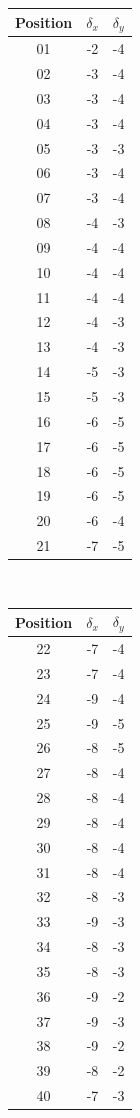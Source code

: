 \documentclass[pdftex,12pt,a4paper]{report}
\begin{document}
\begin{appendices}
\begin{table}[H]
\centering
\begin{tabular}[t]{ c | c | c }
Position & $\delta_x$ & $\delta_y$
\\
\hline
01 & -2 & -4
\\
02 & -3 & -4
\\
03 & -3 & -4
\\
04 & -3 & -4
\\
05 & -3 & -3
\\
06 & -3 & -4
\\
07 & -3 & -4
\\
08 & -4 & -3
\\
09 & -4 & -4
\\
10 & -4 & -4
\\
11 & -4 & -4
\\
12 & -4 & -3
\\
13 & -4 & -3
\\
14 & -5 & -3
\\
15 & -5 & -3
\\
16 & -6 & -5
\\
17 & -6 & -5
\\
18 & -6 & -5
\\
19 & -6 & -5
\\
20 & -6 & -4
\\
21 & -7 & -5
\end{tabular}
~
\begin{tabular}[t]{ c | c | c }
Position & $\delta_x$ & $\delta_y$
\\
\hline
22 & -7 & -4
\\
23 & -7 & -4
\\
24 & -9 & -4
\\
25 & -9 & -5
\\
26 & -8 & -5
\\
27 & -8 & -4
\\
28 & -8 & -4
\\
29 & -8 & -4
\\
30 & -8 & -4
\\
31 & -8 & -4
\\
32 & -8 & -3
\\
33 & -9 & -3
\\
34 & -8 & -3
\\
35 & -8 & -3
\\
36 & -9 & -2
\\
37 & -9 & -3
\\
38 & -9 & -2
\\
39 & -8 & -2
\\
40 & -7 & -3
\\

\end{tabular}
\end{table}
\end{appendices}
\end{document}
